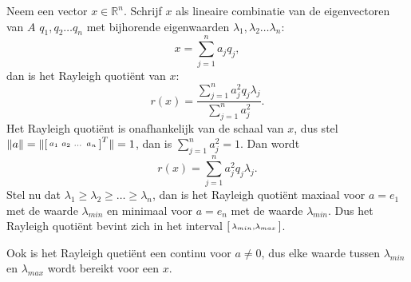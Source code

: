 Neem een vector $x \in \mathbb{R}^n$. Schrijf $x$ als lineaire combinatie van de eigenvectoren van $A$ $q_1, q_2 \dots q_n$ met bijhorende eigenwaarden $\lambda_1, \lambda_2 \dots \lambda_n$:
$$ x = \sum_{j=1}^{n}a_jq_j,$$
dan is het Rayleigh quoti\"ent van $x$:
$$r(x) = \frac{\sum_{j=1}^{n}a_j^2q_j\lambda_j}{\sum_{j=1}^{n}a_j^2}.$$
Het Rayleigh quoti\"ent is onafhankelijk van de schaal van $x$, dus stel $\lVert a \rVert = \lVert \begin{bsmallmatrix} a_1&a_2&\dots&a_n\end{bsmallmatrix}^T \rVert = 1$, dan is $\sum_{j=1}^{n}a_j^2 = 1$. Dan wordt
$$r(x) = \sum_{j=1}^{n}a_j^2q_j\lambda_j.$$
Stel nu dat $\lambda_1 \geq \lambda_2 \geq \dots \geq \lambda_n$, dan is het Rayleigh quoti\"ent maxiaal voor $a = e_1$ met de waarde $\lambda_{min}$ en minimaal voor $a = e_n$ met de waarde $\lambda_{min}$. Dus het Rayleigh quoti\"ent bevint zich in het interval $\begin{bsmallmatrix}\lambda_{min},\lambda_{max}\end{bsmallmatrix}$.

Ook is het Rayleigh queti\"ent een continu voor $a \neq 0$, dus elke waarde tussen $\lambda_{min}$ en $\lambda_{max}$ wordt bereikt voor een $x$.